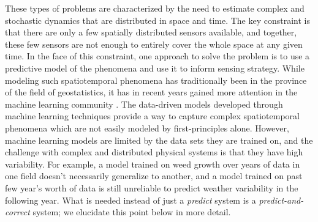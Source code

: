 

These types of problems are characterized by the need to estimate complex and stochastic dynamics that are distributed in space and time. The key constraint is that there are only a  few spatially distributed sensors available, and together, these few sensors are not enough to entirely cover the whole space at any given time. In the face of this constraint, one approach to solve the problem is to use a predictive model of the phenomena and use it to inform sensing strategy. %
While modeling such spatiotemporal phenomena has traditionally been in the province of the field of geostatistics, it has in recent years gained more attention in the machine learning community \cite{cressie2011statistics}. The data-driven models developed through machine learning techniques provide a way to capture complex spatiotemporal phenomena which are not easily modeled by first-principles alone. However, machine learning models are limited by the data sets they are trained on, and the challenge with complex and distributed physical systems is that they have high variability. For example, a model trained on weed growth over years of data in one field doesn't necessarily generalize to another, and a model trained on past few year's worth of data is still unreliable to predict weather variability in the following year. What is needed instead of just a \textit{predict} system is a \textit{predict-and-correct} system; we elucidate this point below in more detail.



